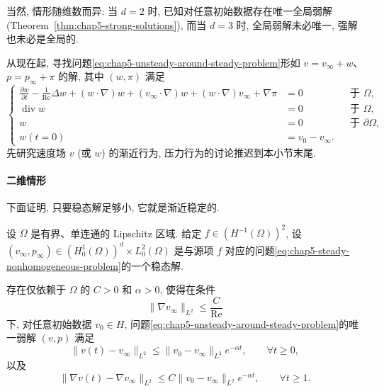当然, 情形随维数而异: 当 $d=2$ 时, 已知对任意初始数据存在唯一全局弱解 (Theorem~\ref{thm:chap5-strong-solutions}), 而当 $d=3$ 时, 全局弱解未必唯一, 强解也未必是全局的.

从现在起, 寻找问题\eqref{eq:chap5-unsteady-around-steady-problem}形如 $v=v_\infty+w$、$p=p_\infty+\pi$ 的解, 其中 $(w,\pi)$ 满足
\begin{equation}
\left\{
\begin{aligned}
 \frac{\partial w}{\partial t}-\frac1{\operatorname{Re}}\Delta w
 +(w\cdot\nabla)w+(v_\infty\cdot\nabla)w
 +(w\cdot\nabla)v_\infty+\nabla\pi&=0&&\text{于 }\Omega,\\
 \operatorname{div}w&=0&&\text{于 }\Omega,\\
 w&=0&&\text{于 }\partial\Omega,\\
 w(t=0)&=v_0-v_\infty.
\end{aligned}
\right.
\label{eq:chap5-steady-perturbation-problem}
\end{equation}
先研究速度场 $v$ (或 $w$) 的渐近行为, 压力行为的讨论推迟到本小节末尾.

\paragraph{二维情形}
\label{subsec:chap5-steady-asymptotic-two-dimensional}

下面证明, 只要稳态解足够小, 它就是渐近稳定的.

\begin{Theorem}
\label{thm:chap5-steady-asymptotic-two-dimensional}
设 $\Omega$ 是有界、单连通的 Lipschitz 区域. 给定 $f\in(H^{-1}(\Omega))^2$, 设 $(v_\infty,p_\infty)\in(H_0^1(\Omega))^d\times L_0^2(\Omega)$ 是与源项 $f$ 对应的问题\eqref{eq:chap5-steady-nonhomogeneous-problem}的一个稳态解.

存在仅依赖于 $\Omega$ 的 $C>0$ 和 $\alpha>0$, 使得在条件
\[
 \|\nabla v_\infty\|_{L^2}\leq\frac C{\operatorname{Re}}
\]
下, 对任意初始数据 $v_0\in H$, 问题\eqref{eq:chap5-unsteady-around-steady-problem}的唯一弱解 $(v,p)$ 满足
\[
 \|v(t)-v_\infty\|_{L^2}
 \leq\|v_0-v_\infty\|_{L^2}e^{-\alpha t},
 \qquad\forall t\geq0,
\]
以及
\[
 \|\nabla v(t)-\nabla v_\infty\|_{L^2}
 \leq C\|v_0-v_\infty\|_{L^2}e^{-\alpha t},
 \qquad\forall t\geq1.
\]
\end{Theorem}

